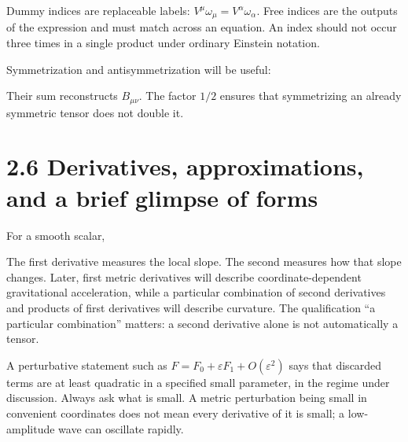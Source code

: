 \documentclass[
  11pt,
  letterpaper,
  oneside,
  openany]{scrbook}
\begin{document}
\endgroup

Dummy indices are replaceable labels:
\(V^\mu\omega_\mu=V^\alpha\omega_\alpha\). Free indices are the outputs
of the expression and must match across an equation. An index should not
occur three times in a single product under ordinary Einstein notation.

Symmetrization and antisymmetrization will be useful:

\begin{center}
\begingroup
{}
\ifdim\wd\grmathbox>\linewidth
\resizebox{\linewidth}{!}{\usebox{\grmathbox}}
\else\usebox{\grmathbox}\fi
\endgroup
\end{center}

Their sum reconstructs \(B_{\mu\nu}\). The factor \(1/2\) ensures that
symmetrizing an already symmetric tensor does not double it.

\hypertarget{derivatives-approximations-and-a-brief-glimpse-of-forms}{%
\section{2.6 Derivatives, approximations, and a brief glimpse of
forms}\label{derivatives-approximations-and-a-brief-glimpse-of-forms}}

For a smooth scalar,

\begin{center}
\begingroup
{}
\ifdim\wd\grmathbox>\linewidth
\resizebox{\linewidth}{!}{\usebox{\grmathbox}}
\else\usebox{\grmathbox}\fi
\endgroup
\end{center}

The first derivative measures the local slope. The second measures how
that slope changes. Later, first metric derivatives will describe
coordinate-dependent gravitational acceleration, while a particular
combination of second derivatives and products of first derivatives will
describe curvature. The qualification ``a particular combination''
matters: a second derivative alone is not automatically a tensor.

A perturbative statement such as
\(F=F_0+\varepsilon F_1+O(\varepsilon^2)\) says that discarded terms are
at least quadratic in a specified small parameter, in the regime under
discussion. Always ask what is small. A metric perturbation being small
in convenient coordinates does not mean every derivative of it is small;
a low-amplitude wave can oscillate rapidly.
\end{document}
